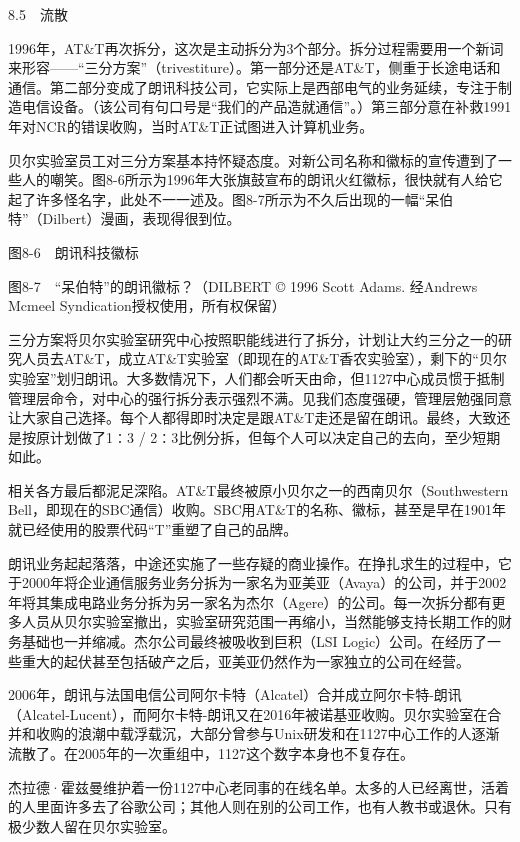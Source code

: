 \documentclass[a4paper,12pt,UTF8,twoside]{ctexbook}
\begin{document}
8.5　流散


1996年，AT\&T再次拆分，这次是主动拆分为3个部分。拆分过程需要用一个新词来形容——“三分方案”（trivestiture）。第一部分还是AT\&T，侧重于长途电话和通信。第二部分变成了朗讯科技公司，它实际上是西部电气的业务延续，专注于制造电信设备。（该公司有句口号是“我们的产品造就通信”。）第三部分意在补救1991年对NCR的错误收购，当时AT\&T正试图进入计算机业务。

贝尔实验室员工对三分方案基本持怀疑态度。对新公司名称和徽标的宣传遭到了一些人的嘲笑。图8-6所示为1996年大张旗鼓宣布的朗讯火红徽标，很快就有人给它起了许多怪名字，此处不一一述及。图8-7所示为不久后出现的一幅“呆伯特”（Dilbert）漫画，表现得很到位。



图8-6　朗讯科技徽标



图8-7　“呆伯特”的朗讯徽标？（DILBERT © 1996 Scott Adams. 经Andrews Mcmeel Syndication授权使用，所有权保留）

三分方案将贝尔实验室研究中心按照职能线进行了拆分，计划让大约三分之一的研究人员去AT\&T，成立AT\&T实验室（即现在的AT\&T香农实验室），剩下的“贝尔实验室”划归朗讯。大多数情况下，人们都会听天由命，但1127中心成员惯于抵制管理层命令，对中心的强行拆分表示强烈不满。见我们态度强硬，管理层勉强同意让大家自己选择。每个人都得即时决定是跟AT\&T走还是留在朗讯。最终，大致还是按原计划做了1∶3 / 2∶3比例分拆，但每个人可以决定自己的去向，至少短期如此。

相关各方最后都泥足深陷。AT\&T最终被原小贝尔之一的西南贝尔（Southwestern Bell，即现在的SBC通信）收购。SBC用AT\&T的名称、徽标，甚至是早在1901年就已经使用的股票代码“T”重塑了自己的品牌。

朗讯业务起起落落，中途还实施了一些存疑的商业操作。在挣扎求生的过程中，它于2000年将企业通信服务业务分拆为一家名为亚美亚（Avaya）的公司，并于2002年将其集成电路业务分拆为另一家名为杰尔（Agere）的公司。每一次拆分都有更多人员从贝尔实验室撤出，实验室研究范围一再缩小，当然能够支持长期工作的财务基础也一并缩减。杰尔公司最终被吸收到巨积（LSI Logic）公司。在经历了一些重大的起伏甚至包括破产之后，亚美亚仍然作为一家独立的公司在经营。

2006年，朗讯与法国电信公司阿尔卡特（Alcatel）合并成立阿尔卡特-朗讯（Alcatel-Lucent），而阿尔卡特-朗讯又在2016年被诺基亚收购。贝尔实验室在合并和收购的浪潮中载浮载沉，大部分曾参与Unix研发和在1127中心工作的人逐渐流散了。在2005年的一次重组中，1127这个数字本身也不复存在。

杰拉德·霍兹曼维护着一份1127中心老同事的在线名单。太多的人已经离世，活着的人里面许多去了谷歌公司；其他人则在别的公司工作，也有人教书或退休。只有极少数人留在贝尔实验室。
\end{document}
